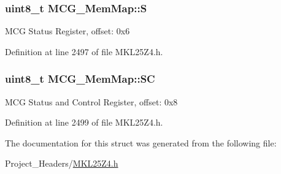 \subsubsection[{\texorpdfstring{S}{S}}]{\setlength{\rightskip}{0pt plus 5cm}uint8\+\_\+t M\+C\+G\+\_\+\+Mem\+Map\+::S}\hypertarget{struct_m_c_g___mem_map_a65ee0333e0d5c462c7dd8c2402bf93be}{}\label{struct_m_c_g___mem_map_a65ee0333e0d5c462c7dd8c2402bf93be}
M\+CG Status Register, offset\+: 0x6 

Definition at line 2497 of file M\+K\+L25\+Z4.\+h.

\subsubsection[{\texorpdfstring{SC}{SC}}]{\setlength{\rightskip}{0pt plus 5cm}uint8\+\_\+t M\+C\+G\+\_\+\+Mem\+Map\+::\+SC}\hypertarget{struct_m_c_g___mem_map_aeff584aa52340d7c66dc06789ad05310}{}\label{struct_m_c_g___mem_map_aeff584aa52340d7c66dc06789ad05310}
M\+CG Status and Control Register, offset\+: 0x8 

Definition at line 2499 of file M\+K\+L25\+Z4.\+h.



The documentation for this struct was generated from the following file\+:\begin{DoxyCompactItemize}
\item 
Project\+\_\+\+Headers/\hyperlink{_m_k_l25_z4_8h}{M\+K\+L25\+Z4.\+h}\end{DoxyCompactItemize}
